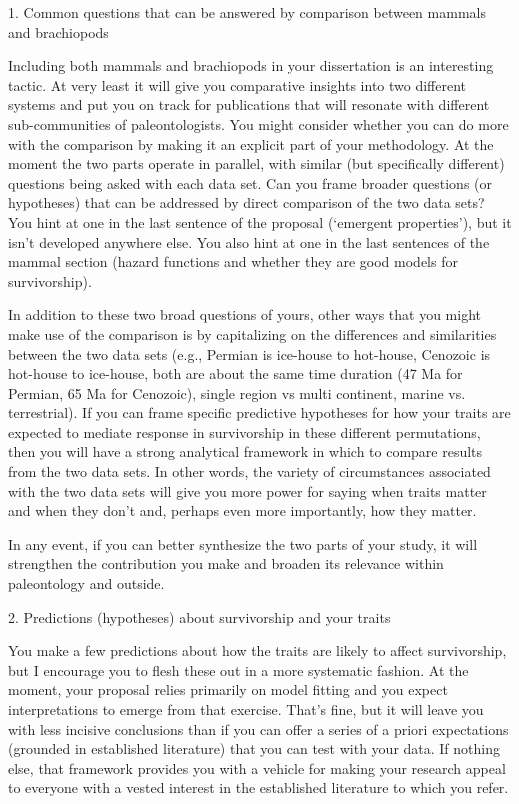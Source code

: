 \documentclass{article}
\begin{document}
1. Common questions that can be answered by comparison between mammals and brachiopods

Including both mammals and brachiopods in your dissertation is an interesting tactic.  At very least it will give you comparative insights into two different systems and put you on track for publications that will resonate with different sub-communities of paleontologists.  You might consider whether you can do more with the comparison by making it an explicit part of your methodology.  At the moment the two parts operate in parallel, with similar (but specifically different) questions being asked with each data set.  Can you frame broader questions (or hypotheses) that can be addressed by direct comparison of the two data sets?  You hint at one in the last sentence of the proposal (‘emergent properties’), but it isn’t developed anywhere else.  You also hint at one in the last sentences of the mammal section (hazard functions and whether they are good models for survivorship). 

In addition to these two broad questions of yours, other ways that you might make use of the comparison is by capitalizing on the differences and similarities between the two data sets (e.g., Permian is ice-house to hot-house, Cenozoic is hot-house to ice-house, both are about the same time duration (47 Ma for Permian, 65 Ma for Cenozoic), single region vs multi continent, marine vs. terrestrial).  If you can frame specific predictive hypotheses for how your traits are expected to mediate response in survivorship in these different permutations, then you will have a strong analytical framework in which to compare results from the two data sets.  In other words, the variety of circumstances associated with the two data sets will give you more power for saying when traits matter and when they don’t and, perhaps even more importantly, how they matter.

In any event, if you can better synthesize the two parts of your study, it will strengthen the contribution you make and broaden its relevance within paleontology and outside. 

2. Predictions (hypotheses) about survivorship and your traits

You make a few predictions about how the traits are likely to affect survivorship, but I encourage you to flesh these out in a more systematic fashion.  At the moment, your proposal relies primarily on model fitting and you expect interpretations to emerge from that exercise.  That’s fine, but it will leave you with less incisive conclusions than if you can offer a series of a priori expectations (grounded in established literature) that you can test with your data.  If nothing else, that framework provides you with a vehicle for making your research appeal to everyone with a vested interest in the established literature to which you refer. 
\end{document}
